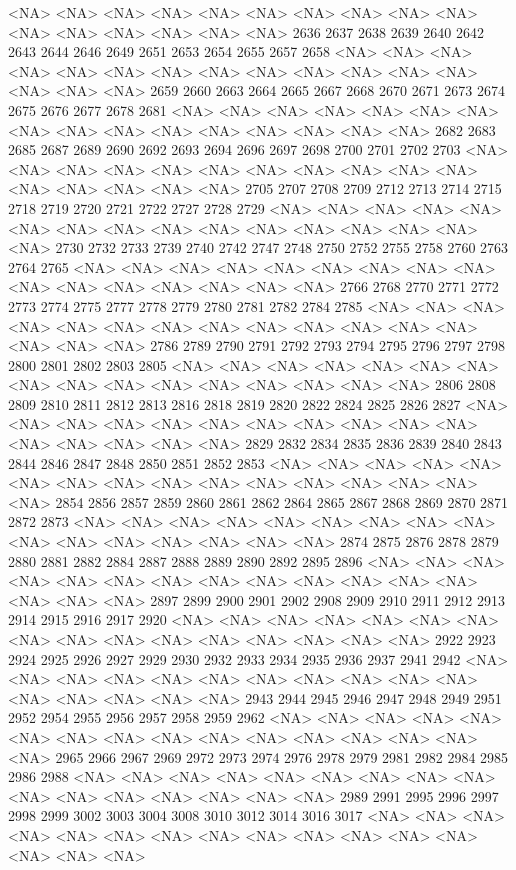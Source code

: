 \documentclass{article}
\begin{document}
\begin{Schunk}
\begin{Soutput}
<NA> <NA> <NA> <NA> <NA> <NA> <NA> <NA> <NA> <NA> <NA> <NA> <NA> <NA> <NA> <NA> 
2636 2637 2638 2639 2640 2642 2643 2644 2646 2649 2651 2653 2654 2655 2657 2658 
<NA> <NA> <NA> <NA> <NA> <NA> <NA> <NA> <NA> <NA> <NA> <NA> <NA> <NA> <NA> <NA> 
2659 2660 2663 2664 2665 2667 2668 2670 2671 2673 2674 2675 2676 2677 2678 2681 
<NA> <NA> <NA> <NA> <NA> <NA> <NA> <NA> <NA> <NA> <NA> <NA> <NA> <NA> <NA> <NA> 
2682 2683 2685 2687 2689 2690 2692 2693 2694 2696 2697 2698 2700 2701 2702 2703 
<NA> <NA> <NA> <NA> <NA> <NA> <NA> <NA> <NA> <NA> <NA> <NA> <NA> <NA> <NA> <NA> 
2705 2707 2708 2709 2712 2713 2714 2715 2718 2719 2720 2721 2722 2727 2728 2729 
<NA> <NA> <NA> <NA> <NA> <NA> <NA> <NA> <NA> <NA> <NA> <NA> <NA> <NA> <NA> <NA> 
2730 2732 2733 2739 2740 2742 2747 2748 2750 2752 2755 2758 2760 2763 2764 2765 
<NA> <NA> <NA> <NA> <NA> <NA> <NA> <NA> <NA> <NA> <NA> <NA> <NA> <NA> <NA> <NA> 
2766 2768 2770 2771 2772 2773 2774 2775 2777 2778 2779 2780 2781 2782 2784 2785 
<NA> <NA> <NA> <NA> <NA> <NA> <NA> <NA> <NA> <NA> <NA> <NA> <NA> <NA> <NA> <NA> 
2786 2789 2790 2791 2792 2793 2794 2795 2796 2797 2798 2800 2801 2802 2803 2805 
<NA> <NA> <NA> <NA> <NA> <NA> <NA> <NA> <NA> <NA> <NA> <NA> <NA> <NA> <NA> <NA> 
2806 2808 2809 2810 2811 2812 2813 2816 2818 2819 2820 2822 2824 2825 2826 2827 
<NA> <NA> <NA> <NA> <NA> <NA> <NA> <NA> <NA> <NA> <NA> <NA> <NA> <NA> <NA> <NA> 
2829 2832 2834 2835 2836 2839 2840 2843 2844 2846 2847 2848 2850 2851 2852 2853 
<NA> <NA> <NA> <NA> <NA> <NA> <NA> <NA> <NA> <NA> <NA> <NA> <NA> <NA> <NA> <NA> 
2854 2856 2857 2859 2860 2861 2862 2864 2865 2867 2868 2869 2870 2871 2872 2873 
<NA> <NA> <NA> <NA> <NA> <NA> <NA> <NA> <NA> <NA> <NA> <NA> <NA> <NA> <NA> <NA> 
2874 2875 2876 2878 2879 2880 2881 2882 2884 2887 2888 2889 2890 2892 2895 2896 
<NA> <NA> <NA> <NA> <NA> <NA> <NA> <NA> <NA> <NA> <NA> <NA> <NA> <NA> <NA> <NA> 
2897 2899 2900 2901 2902 2908 2909 2910 2911 2912 2913 2914 2915 2916 2917 2920 
<NA> <NA> <NA> <NA> <NA> <NA> <NA> <NA> <NA> <NA> <NA> <NA> <NA> <NA> <NA> <NA> 
2922 2923 2924 2925 2926 2927 2929 2930 2932 2933 2934 2935 2936 2937 2941 2942 
<NA> <NA> <NA> <NA> <NA> <NA> <NA> <NA> <NA> <NA> <NA> <NA> <NA> <NA> <NA> <NA> 
2943 2944 2945 2946 2947 2948 2949 2951 2952 2954 2955 2956 2957 2958 2959 2962 
<NA> <NA> <NA> <NA> <NA> <NA> <NA> <NA> <NA> <NA> <NA> <NA> <NA> <NA> <NA> <NA> 
2965 2966 2967 2969 2972 2973 2974 2976 2978 2979 2981 2982 2984 2985 2986 2988 
<NA> <NA> <NA> <NA> <NA> <NA> <NA> <NA> <NA> <NA> <NA> <NA> <NA> <NA> <NA> <NA> 
2989 2991 2995 2996 2997 2998 2999 3002 3003 3004 3008 3010 3012 3014 3016 3017 
<NA> <NA> <NA> <NA> <NA> <NA> <NA> <NA> <NA> <NA> <NA> <NA> <NA> <NA> <NA> <NA> 

\end{Soutput}
\end{Schunk}
\end{document}
